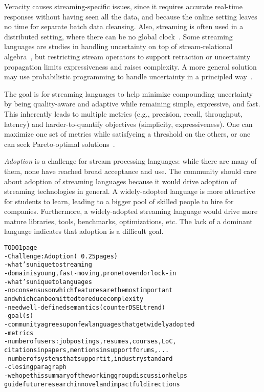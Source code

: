 Veracity causes streaming-specific issues, since it requires accurate
real-time responses without having seen all the data, and because the
online setting leaves no time for separate batch data cleansing. Also,
streaming is often used in a distributed setting, where there can be
no global clock~\cite{lamport_1978}. Some streaming languages are
studies in handling uncertainty on top of stream-relational
algebra~\cite{ali_et_al_2009,tran_et_al_2010}, but restricting stream
operators to support retraction or uncertainty propagation limits
expressiveness and raises complexity. A more general solution may use
probabilistic programming to handle uncertainty in a principled
way~\cite{gordon_et_al_2014}.

The goal is for streaming languages to help minimize compounding
uncertainty by being quality-aware and adaptive while remaining
simple, expressive, and fast. This inherently leads to multiple
metrics (e.g., precision, recall, throughput, latency) and
harder-to-quantify objectives (simplicity, expressiveness). One can
maximize one set of metrics while satisfycing a threshold on the
others, or one can seek Pareto-optimal
solutions~\cite{zhang_hirzel_grove_2016}.

\emph{Adoption} is a challenge for stream processing languages: while
there are many of them, none have reached broad acceptance and use.
The community should care about adoption of streaming languages
because it would drive adoption of streaming technologies in general.
A widely-adopted language is more attractive for students to learn,
leading to a bigger pool of skilled people to hire for companies.
Furthermore, a widely-adopted streaming language would drive more
mature libraries, tools, benchmarks, optimizations, etc. The lack of a
dominant language indicates that adoption is a difficult goal.

\begin{alltt}TODO\scriptsize 1 page
- Challenge: Adoption (~0.25 pages)
  - what's unique to streaming
    - domain is young, fast-moving, prone to vendor lock-in
  - what's unique to languages
    - no consensus on which features are the most important
      and which can be omitted to reduce complexity
    - need well-defined semantics (counter DSEL trend)
  - goal(s)
    - community agrees upon few languages that get widely adopted
  - metrics
    - number of users: job postings, resumes, courses, LoC,
      citations in papers, mentions in support forums, ...
    - number of systems that support it, industry standard
- closing paragraph
  - we hope this summary of the working group discussion helps
    guide future research in novel and impactful directions
\end{alltt}
